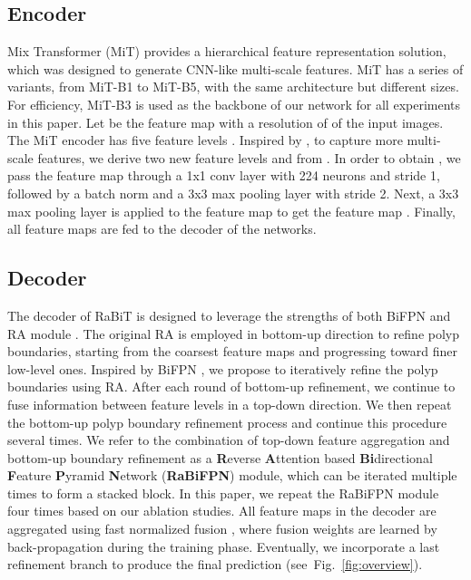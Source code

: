 \documentclass{article}
\begin{document}
\subsection{Encoder}
Mix Transformer (MiT) \cite{segformer} provides a hierarchical feature representation solution, which was designed to generate CNN-like multi-scale features. MiT has a series of variants, from MiT-B1 to MiT-B5, with the same architecture but different sizes. For efficiency, MiT-B3 is used as the backbone of our network for all experiments in this paper. Let  be the feature map with a resolution of  of the input images. The MiT encoder has five feature levels . Inspired by \cite{tan2020efficientdet}, to capture more multi-scale features, we derive two new feature levels  and  from . In order to obtain , we pass the feature map  through a 1x1 conv layer with 224 neurons and stride 1, followed by a batch norm and a 3x3 max pooling layer with stride 2. Next, a 3x3 max pooling layer is applied to the feature map  to get the feature map . Finally, all feature maps  are fed to the decoder of the networks. 

\subsection{Decoder}

The decoder of RaBiT is designed to leverage the strengths of both BiFPN \cite{tan2020efficientdet} and RA module \cite{pranet}. The original RA \cite{pranet} is employed in bottom-up direction to refine polyp boundaries, starting from the coarsest feature maps and progressing toward finer low-level ones. Inspired by BiFPN \cite{tan2020efficientdet}, we propose to iteratively refine the polyp boundaries using RA. After each round of bottom-up refinement, we continue to fuse information between feature levels in a top-down direction. We then repeat the bottom-up polyp boundary refinement process and continue this procedure several times. We refer to the combination of top-down feature aggregation and bottom-up boundary refinement as a \textbf{R}everse \textbf{A}ttention based \textbf{Bi}directional \textbf{F}eature \textbf{P}yramid \textbf{N}etwork (\textbf{RaBiFPN}) module, which can be iterated multiple times to form a stacked block. In this paper, we repeat the RaBiFPN module four times based on our ablation studies. All feature maps in the decoder are aggregated using fast normalized fusion \cite{tan2020efficientdet}, where fusion weights are learned by back-propagation during the training phase. Eventually, we incorporate a last refinement branch to produce the final prediction (see~Fig.~\ref{fig:overview}).
\end{document}
